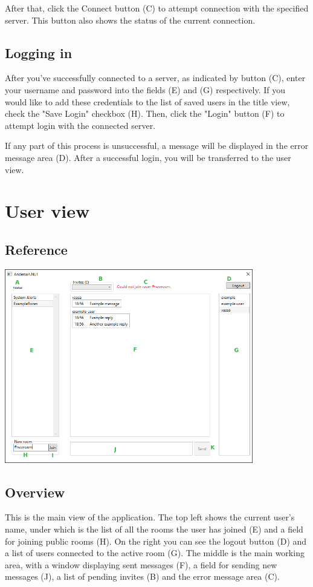 \documentclass[titlepage]{scrartcl}
\begin{document}
After that, click the Connect button (C) to attempt connection with the specified server. This button also shows the status of the current connection.

\subsection{Logging in}
After you've successfully connected to a server, as indicated by button (C), enter your username and password into the fields (E) and (G) respectively. If you would like to add these credentials to the list of saved users in the title view, check the "Save Login" checkbox (H). Then, click the "Login" button (F) to attempt login with the connected server.

If any part of this process is unsuccessful, a message will be displayed in the error message area (D). After a successful login, you will be transferred to the user view.

\section{User view}
\subsection{Reference}
\begin{center}
    \includegraphics[width=410px]{user-window.png}
\end{center}

\subsection{Overview}
This is the main view of the application. The top left shows the current user's name, under which is the list of all the rooms the user has joined (E) and a field for joining public rooms (H). On the right you can see the logout button (D) and a list of users connected to the active room (G). The middle is the main working area, with a window displaying sent messages (F), a field for sending new messages (J), a list of pending invites (B) and the error message area (C).
\end{document}
